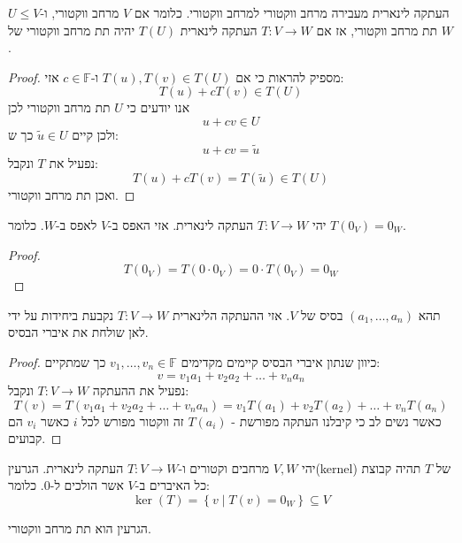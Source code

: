\documentclass{tstextbook}
\begin{document}
\begin{proposition}
העתקה לינארית מעבירה מרחב ווקטורי למרחב ווקטורי. כלומר אם \(V\) מרחב ווקטורי, ו-\(U\leq V\) תת מרחב ווקטורי, אז אם \(T:V\to W\) העתקה לינארית \(T(U)\) יהיה תת מרחב ווקטורי של \(W\).

\end{proposition}
\begin{proof}
מספיק להראות כי אם \(T(u),T(v) \in T(U)\) ו-\(c \in \mathbb{F}\) אזי:
$$T(u)+cT(v) \in T(U)$$
אנו יודעים כי \(U\) תת מרחב ווקטורי לכן
$$u+cv \in U$$
ולכן קיים \(\tilde{u} \in U\) כך ש:
$$u+cv = \tilde{u}$$
נפעיל את \(T\) ונקבל:
$$T(u)+cT(v)=T\left( \tilde{u} \right)\in T(U)$$
ואכן תת מרחב ווקטורי.

\end{proof}
\begin{proposition}
יהי \(T:V\to W\) העתקה לינארית. אזי האפס ב-\(V\) לאפס ב-\(W\). כלומר \(T(0_{V})=0_{W}\).

\end{proposition}
\begin{proof}
$$T(0_{V})=T\left( 0\cdot 0_{V} \right)=0\cdot T(0_{V})=0_{W}$$

\end{proof}
\begin{proposition}
תהא \(\left( a_{1},\dots,a_{n} \right)\) בסיס של \(V\). אזי ההעתקה הלינארית \(T:V\to W\) נקבעת ביחידות על ידי לאן שולחת את איברי הבסיס.

\end{proposition}
\begin{proof}
כיוון שנתון איברי הבסיס קיימים מקדימים \(v_{1},\dots,v_{n}\in \mathbb{F}\) כך שמתקיים:
$$v=v_{1}a_{1}+v_{2}a_{2}+\dots+v_{n}a_{n}$$
נפעיל את ההעתקה \(T:V\to W\) ונקבל:
$$T(v)=T\left( v_{1}a_{1}+v_{2}a_{2}+\dots+v_{n}a_{n} \right)=v_{1}T(a_{1})+v_{2}T(a_{2})+\dots+v_{n}T(a_{n})$$
כאשר נשים לב כי קיבלנו העתקה מפורשת - \(T(a_{i})\) זה ווקטור מפורש לכל \(i\) כאשר \(v_{i}\) הם קבועים.

\end{proof}
\begin{definition}
יהי \(V,W\) מרחבים וקטורים ו-\(T:V\to W\) העתקה לינארית. הגרעין(kernel) של \(T\) תהיה קבוצת כל האיברים ב-\(V\) אשר הולכים ל-0. כלומר:
$$\ker (T)=\left\{  v\mid T(v)=0_{W}  \right\}\subseteq V$$

\end{definition}
\begin{proposition}
הגרעין הוא תת מרחב ווקטורי.

\end{proposition}
\end{document}
